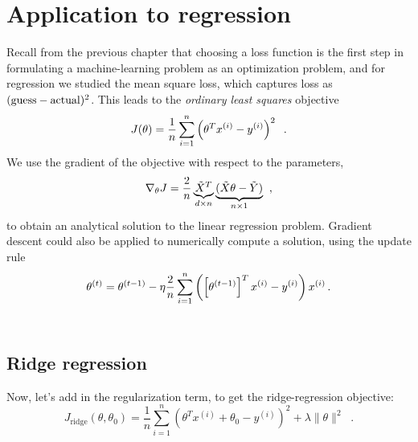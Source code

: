 \section{Application to regression}

\label{sec-gd_ridge}

Recall from the previous chapter that choosing a loss function is the
first step in formulating a machine-learning problem as an
optimization problem, and for regression we studied the mean square
loss, which captures loss as
$({\rm guess} - {\rm actual})^2$.
This leads to the {\em ordinary least squares} objective
\begin{equation}
  J(\theta) = \frac{1}{n}\sum_{i =
    1}^n\left(\theta^Tx^{(i)} - y^{(i)}\right)^2 \;\;.
\end{equation}
We use the gradient of the objective with respect to the parameters,
\begin{equation}
  \nabla_{\theta}J = \frac{2}{n}\underbrace{\tilde{X}^T}_{d \times
    n}\underbrace{(\tilde{X}\theta - \tilde{Y})}_{n \times 1}\;\;,
  \label{eq:reg_gd_deriv}
\end{equation}
to obtain an
analytical solution to the linear regression problem.  Gradient
descent could also be applied to numerically compute a solution, using
the update rule
\begin{equation}
  \theta^{(t)} = \theta^{(t-1)} - \eta \frac{2}{n} \sum_{i=1}^{n} \left( \left[ \theta^{(t-1)}\right]^T x^{(i)} - y^{(i)} \right) x^{(i)}
  \,.
\end{equation}
{~\hfill ~}

\subsection{Ridge regression}
Now, let's add in the regularization term, to get the ridge-regression
objective:
$$ J_{\text{ridge}}(\theta, \theta_0) = \frac{1}{n}\sum_{i = 1}^n\left(\theta^Tx^{(i)} + \theta_0 - y^{(i)}\right)^2 + \lambda\|\theta\|^2 \;\;.$$

